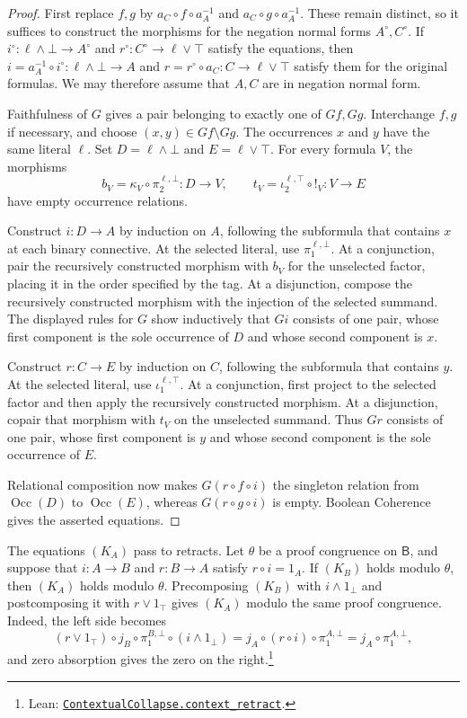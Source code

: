 \documentclass[11pt]{article}
\newcommand{\B}{\mathsf B}
\newcommand{\Occ}{\operatorname{Occ}}
\begin{document}
\begin{proof}
First replace $f,g$ by $a_C\circ f\circ a_A^{-1}$ and
$a_C\circ g\circ a_A^{-1}$. These remain distinct, so it suffices to
construct the morphisms for the negation normal forms $A^\circ,C^\circ$.
If
$i^\circ:\ell\wedge\bot\to A^\circ$ and
$r^\circ:C^\circ\to\ell\vee\top$ satisfy the equations,
then $i=a_A^{-1}\circ i^\circ:\ell\wedge\bot\to A$ and
$r=r^\circ\circ a_C:C\to\ell\vee\top$ satisfy them for the original
formulas.
We may therefore assume that $A,C$ are in negation normal form.

Faithfulness of $G$ gives a pair belonging to exactly one of $Gf,Gg$.
Interchange $f,g$ if necessary, and choose
$(x,y)\in Gf\setminus Gg$. The occurrences $x$ and $y$ have the same
literal $\ell$. Set $D=\ell\wedge\bot$ and $E=\ell\vee\top$.
For every formula $V$, the morphisms
\[
 b_V=\kappa_V\circ\pi_2^{\ell,\bot}:D\to V,
 \qquad
 t_V=\iota_2^{\ell,\top}\circ!_V:V\to E
\]
have empty occurrence relations.

Construct $i:D\to A$ by induction on $A$, following the subformula
that contains $x$ at each binary connective. At the selected literal, use $\pi_1^{\ell,\bot}$.
At a conjunction, pair the recursively constructed morphism with $b_V$
for the unselected factor, placing it in the order specified by the
tag. At a disjunction, compose the recursively constructed morphism
with the injection of the selected summand. The displayed rules for
$G$ show inductively that $Gi$ consists of one pair, whose first component
is the sole occurrence of $D$ and whose second component is $x$.

Construct $r:C\to E$ by induction on $C$, following the subformula
that contains $y$.
At the selected literal, use $\iota_1^{\ell,\top}$.
At a conjunction, first project to the selected factor and then apply
the recursively constructed morphism. At a disjunction, copair that
morphism with $t_V$ on the unselected summand. Thus $Gr$ consists of one pair,
whose first component is $y$ and whose second component is the sole
occurrence of $E$.

Relational composition now makes $G(r\circ f\circ i)$ the singleton
relation from $\Occ(D)$ to $\Occ(E)$, whereas
$G(r\circ g\circ i)$ is empty. Boolean Coherence gives the asserted
equations.
\end{proof}

The equations $(K_A)$ pass to retracts. Let $\theta$ be a proof
congruence on $\B$, and suppose that $i:A\to B$ and $r:B\to A$
satisfy $r\circ i=1_A$. If $(K_B)$ holds modulo $\theta$, then
$(K_A)$ holds modulo $\theta$.
Precomposing $(K_B)$ with $i\wedge1_\bot$ and postcomposing it
with $r\vee1_\top$ gives $(K_A)$ modulo the same proof
congruence. Indeed, the left side becomes
\[
 (r\vee1_\top)\circ j_B\circ\pi_1^{B,\bot}\circ(i\wedge1_\bot)
 =j_A\circ(r\circ i)\circ\pi_1^{A,\bot}
 =j_A\circ\pi_1^{A,\bot},
\]
and zero absorption gives the zero on the right.\footnote{\raggedright Lean:
\href{https://github.com/flengyel/Dosen-Petric-Maximality/blob/5dbee39bea09539bd130f729e82636419f71f920/DosenPetric/Substitution.lean\#L74}{\texttt{ContextualCollapse.\allowbreak{}context\_retract}}.}
\end{document}
